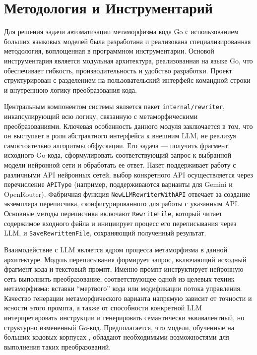 \section{Методология и Инструментарий}

Для решения задачи автоматизации метаморфизма кода Go с использованием больших языковых моделей была разработана и реализована специализированная методология, воплощенная в программном инструментарии. Основой инструментария является модульная архитектура, реализованная на языке Go, что обеспечивает гибкость, производительность и удобство разработки. Проект структурирован с разделением на пользовательский интерфейс командной строки и внутреннюю логику преобразования кода.

Центральным компонентом системы является пакет \texttt{internal/rewriter}, инкапсулирующий всю логику, связанную с метаморфическими преобразованиями. Ключевая особенность данного модуля заключается в том, что он выступает в роли абстрактного интерфейса к внешним LLM, не реализуя самостоятельно алгоритмы обфускации. Его задача — получить фрагмент исходного Go-кода, сформулировать соответствующий запрос к выбранной модели нейронной сети и обработать ее ответ. Пакет поддерживает работу с различными API нейронных сетей, выбор конкретного API осуществляется через перечисление \texttt{APIType} (например, поддерживаются варианты для Gemini и OpenRouter). Фабричная функция \texttt{NewLLMRewriterWithAPI} отвечает за создание экземпляра переписчика, сконфигурированного для работы с указанным API. Основные методы переписчика включают \texttt{RewriteFile}, который читает содержимое входного файла и инициирует процесс его переписывания через LLM, и \texttt{SaveRewrittenFile}, сохраняющий полученный результат.

Взаимодействие с LLM является ядром процесса метаморфизма в данной архитектуре. Модуль переписывания формирует запрос, включающий исходный фрагмент кода и текстовый промпт. Именно промпт инструктирует нейронную сеть выполнить преобразование, соответствующее одной из целевых техник метаморфизма: вставки \enquote{мертвого} кода или модификации потока управления. Качество генерации метаморфического варианта напрямую зависит от точности и ясности этого промпта, а также от способности конкретной LLM интерпретировать инструкции и генерировать семантически эквивалентный, но структурно измененный Go-код. Предполагается, что модели, обученные на больших кодовых корпусах \cite{Chen21Evaluating}, обладают необходимыми возможностями для выполнения таких преобразований.

